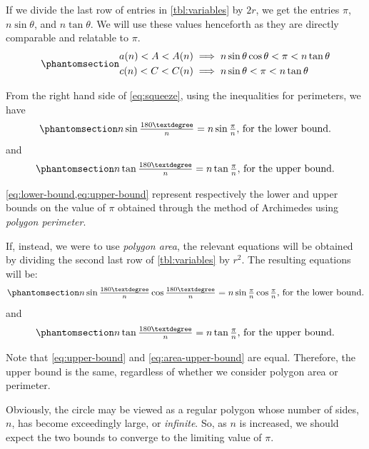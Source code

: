 \documentclass[
  a4paper,
]{article}
\begin{document}
If we divide the last row of entries in \cref{tbl:variables} by \(2r\),
we get the entries \(\pi\), \(n\sin\theta\), and \(n\tan\theta\). We
will use these values henceforth as they are directly comparable and
relatable to \(\pi\). \begin{equation}\phantomsection\label{eq:squeeze}{
\begin{aligned}
a(n) < A < A(n) &\implies n\sin\theta\cos\theta < \pi < n\tan\theta\\
c(n) < C < C(n) &\implies n\sin\theta < \pi < n\tan\theta\\
\end{aligned}
}\end{equation}

From the right hand side of \cref{eq:squeeze}, using the inequalities
for perimeters, we have
\begin{equation}\phantomsection\label{eq:lower-bound}{
n\sin\tfrac{180°}{n} = n\sin\tfrac{\pi}{n}, \thinspace \mbox{for the lower bound}.
}\end{equation} and
\begin{equation}\phantomsection\label{eq:upper-bound}{
n\tan\tfrac{180°}{n} = n\tan\tfrac{\pi}{n}, \thinspace \mbox{for the upper bound}.
}\end{equation}

\cref{eq:lower-bound,eq:upper-bound} represent respectively the lower
and upper bounds on the value of \(\pi\) obtained through the method of
Archimedes using \emph{polygon perimeter}.

If, instead, we were to use \emph{polygon area}, the relevant equations
will be obtained by dividing the second last row of \cref{tbl:variables}
by \(r^2\). The resulting equations will be:
\begin{equation}\phantomsection\label{eq:area-lower-bound}{
n\sin\tfrac{180°}{n}\cos\tfrac{180°}{n} = n\sin\tfrac{\pi}{n}\cos\tfrac{\pi}{n}, \thinspace \mbox{for the lower bound}.
}\end{equation} and
\begin{equation}\phantomsection\label{eq:area-upper-bound}{
n\tan\tfrac{180°}{n} = n\tan\tfrac{\pi}{n}, \thinspace \mbox{for the upper bound}.
}\end{equation}

Note that \cref{eq:upper-bound} and \cref{eq:area-upper-bound} are
equal. Therefore, the upper bound is the same, regardless of whether we
consider polygon area or perimeter.

Obviously, the circle may be viewed as a regular polygon whose number of
sides, \(n\), has become exceedingly large, or \emph{infinite}. So, as
\(n\) is increased, we should expect the two bounds to converge to the
limiting value of \(\pi\).
\end{document}
